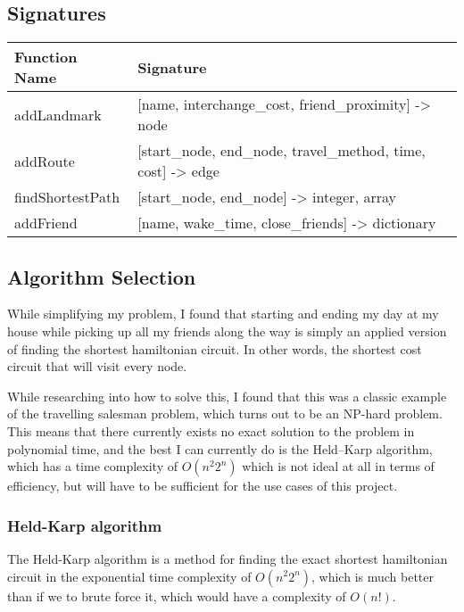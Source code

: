 \documentclass[
]{article}
\begin{document}
\hypertarget{signatures}{%
\subsection{Signatures}\label{signatures}}

\begin{longtable}[]{@{}ll@{}}
\toprule\noalign{}
Function Name & Signature \\
\midrule\noalign{}
\endhead
\bottomrule\noalign{}
\endlastfoot
addLandmark & {[}name, interchange\_cost, friend\_proximity{]}
-\textgreater{} node \\
addRoute & {[}start\_node, end\_node, travel\_method, time, cost{]}
-\textgreater{} edge \\
findShortestPath & {[}start\_node, end\_node{]} -\textgreater{} integer,
array \\
addFriend & {[}name, wake\_time, close\_friends{]} -\textgreater{}
dictionary \\
\end{longtable}

\hypertarget{algorithm-selection}{%
\subsection{Algorithm Selection}\label{algorithm-selection}}

While simplifying my problem, I found that starting and ending my day at
my house while picking up all my friends along the way is simply an
applied version of finding the shortest hamiltonian circuit. In other
words, the shortest cost circuit that will visit every node.

While researching into how to solve this, I found that this was a
classic example of the travelling salesman problem, which turns out to
be an NP-hard problem. This means that there currently exists no exact
solution to the problem in polynomial time, and the best I can currently
do is the Held--Karp algorithm, which has a time complexity of
{\(O(n^{2}2^{n})\)} which is not ideal at all in terms of efficiency,
but will have to be sufficient for the use cases of this project.

\hypertarget{held-karp-algorithm}{%
\subsubsection{Held-Karp algorithm}\label{held-karp-algorithm}}

The Held-Karp algorithm is a method for finding the exact shortest
hamiltonian circuit in the exponential time complexity of
{\(O(n^{2}2^{n})\)}, which is much better than if we to brute force it,
which would have a complexity of {\(O(n!)\)}.
\end{document}
